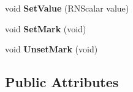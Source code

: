 \begin{DoxyCompactItemize}
\item 
void {\bfseries Set\+Value} (R\+N\+Scalar value)\hypertarget{class_p_d_b_chain_a999ab38ca02f5ef8228e7a505fdc7733}{}\label{class_p_d_b_chain_a999ab38ca02f5ef8228e7a505fdc7733}

\item 
void {\bfseries Set\+Mark} (void)\hypertarget{class_p_d_b_chain_a214e821c8460f3feba5301978e81e06e}{}\label{class_p_d_b_chain_a214e821c8460f3feba5301978e81e06e}

\item 
void {\bfseries Unset\+Mark} (void)\hypertarget{class_p_d_b_chain_aa7ddc26790729a070a2883c799a3a032}{}\label{class_p_d_b_chain_aa7ddc26790729a070a2883c799a3a032}

\end{DoxyCompactItemize}
\subsection*{Public Attributes}
